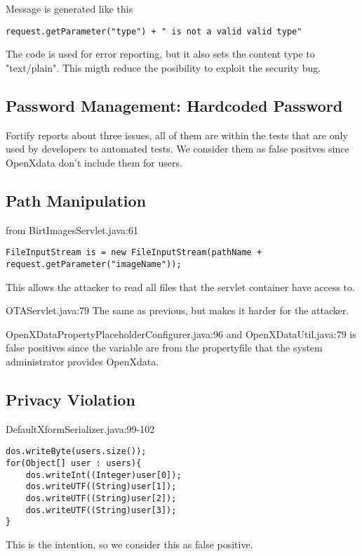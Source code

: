 \documentclass[11pt,a4paper]{article}
\theoremstyle{definition}
\begin{document}
Message is generated like this
\begin{lstlisting}
request.getParameter("type") + " is not a valid valid type"
\end{lstlisting}
The code is used for error reporting, but it also sets the content type to "text/plain".
This migth reduce the posibility to exploit the security bug.

\subsection{Password Management: Hardcoded Password}
Fortify reports about three issues, all of them are within the tests that are only used
by developers to automated tests. We consider them as false positves since OpenXdata don't
include them for users.

\subsection{Path Manipulation}
from BirtImagesServlet.java:61
\begin{lstlisting}
FileInputStream is = new FileInputStream(pathName + request.getParameter("imageName"));
\end{lstlisting}
This allows the attacker to read all files that the servlet container have access to.

OTAServlet.java:79
The same as previous, but makes it harder for the attacker.

OpenXDataPropertyPlaceholderConfigurer.java:96 and OpenXDataUtil.java:79 
is false positives since the variable are from the propertyfile that the system administrator provides OpenXdata.

\subsection{Privacy Violation}
DefaultXformSerializer.java:99-102
\begin{lstlisting}
dos.writeByte(users.size());
for(Object[] user : users){
    dos.writeInt((Integer)user[0]);
    dos.writeUTF((String)user[1]);
    dos.writeUTF((String)user[2]);
    dos.writeUTF((String)user[3]);
}
\end{lstlisting}
This is the intention, so we consider this as false positive.
\end{document}
